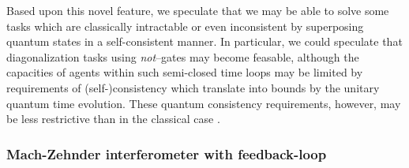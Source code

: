 Based upon this novel feature, we speculate that we may be able to solve
some tasks which are classically intractable or even inconsistent
by superposing quantum states in a self-consistent manner.
In particular, we could speculate that diagonalization tasks using
{\em not}--gates may become feasable,
although the capacities of agents within such semi-closed time loops may be limited
by requirements of (self-)consistency which translate into bounds by the
unitary quantum time evolution.
These quantum consistency requirements, however, may be less restrictive than in the classical
case \cite{maryland,svo-1995-paradox}.


\subsubsection*{Mach-Zehnder interferometer with feedback-loop}

